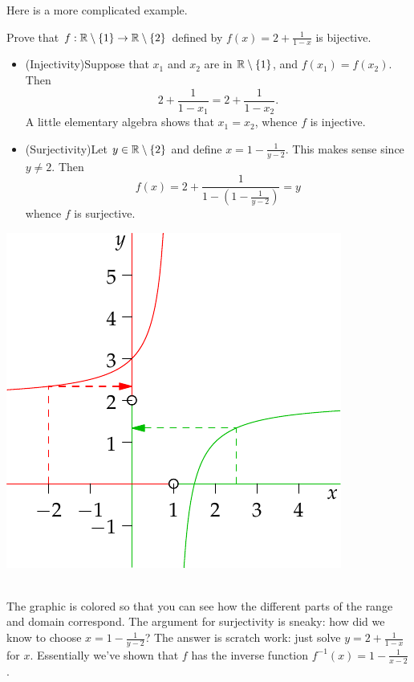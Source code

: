 Here is a more complicated example.
\begin{example}{}{}
Prove that $f:\mathbb{R}\setminus\{1\}\to\mathbb{R}\setminus\{2\}$ defined by $f(x)=2+\frac 1{1-x}$ is bijective.\\[2pt]

\begin{minipage}{0.6\textwidth}
		\begin{itemize}
  	  \item[](Injectivity)\quad Suppose that $x_1$ and $x_2$ are in $\mathbb{R}\setminus\{1\}$, and $f(x_1)=f(x_2)$. Then
			\[2+\frac 1{1-x_1}=2+\frac 1{1-x_2}.\]
			A little elementary algebra shows that $x_1=x_2$, whence $f$ is injective.
  	  \item[](Surjectivity)\quad Let $y\in\mathbb{R}\setminus\{2\}$ and define $x=1-\frac 1{y-2}$. This makes sense since $y\neq 2$. Then
  	  \[f(x)=2+\frac 1{1-(1-\frac 1{y-2})}=y\]
  	  whence $f$ is surjective.
		\end{itemize}
  \end{minipage}\qquad
  \begin{minipage}{0.35\textwidth}
  	\includegraphics[width=\textwidth]{sets-09-bij}
  \end{minipage}\\[2pt]
The graphic is colored so that you can see how the different parts of the range and domain correspond. The argument for surjectivity is sneaky: how did we know to choose $x=1-\frac 1{y-2}$? The answer is scratch work: just solve $y=2+\frac 1{1-x}$ for $x$. Essentially we've shown that $f$ has the inverse function $f^{-1}(x)=1-\frac 1{x-2}$.
\end{example}

